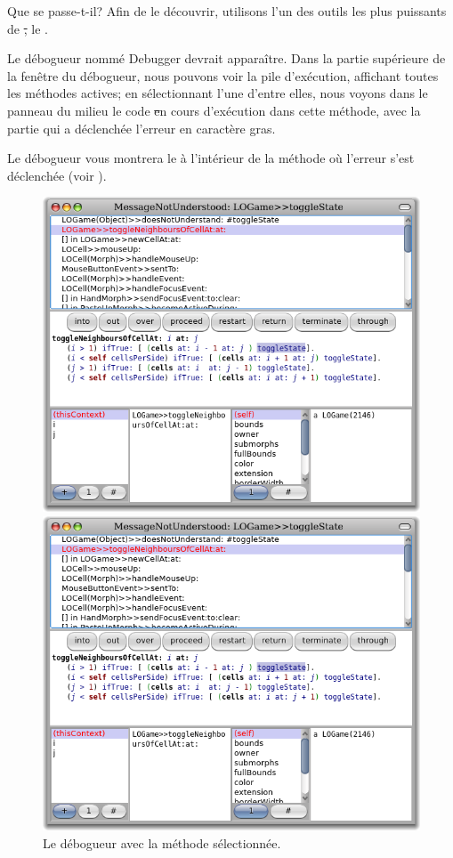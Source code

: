 \documentclass[a4paper,10pt,twoside]{book}
\begin{document}
\noindent
Que se passe-t-il? Afin de le découvrir, utilisons l'un des outils les plus puissants de \st, le .

Le débogueur nommé Debugger devrait apparaître.
Dans la partie supérieure de la fenêtre du débogueur, nous pouvons
voir la pile d'exécution, affichant toutes les méthodes actives; en
sélectionnant l'une d'entre elles, nous voyons dans le panneau du
milieu le code \st en cours d'exécution dans cette méthode, avec
la partie qui a déclenchée l'erreur en caractère gras.

Le débogueur vous montrera le  à l'intérieur
de la méthode où l'erreur s'est déclenchée (voir ).

\begin{figure}[ht]
\ifluluelse
	{\centerline {\includegraphics[width=\textwidth]{Debugger}}}
	{\centerline {\includegraphics[scale=0.7]{Debugger}}}
\caption{Le débogueur avec la méthode  sélectionnée.
}
\end{figure}
\end{document}

